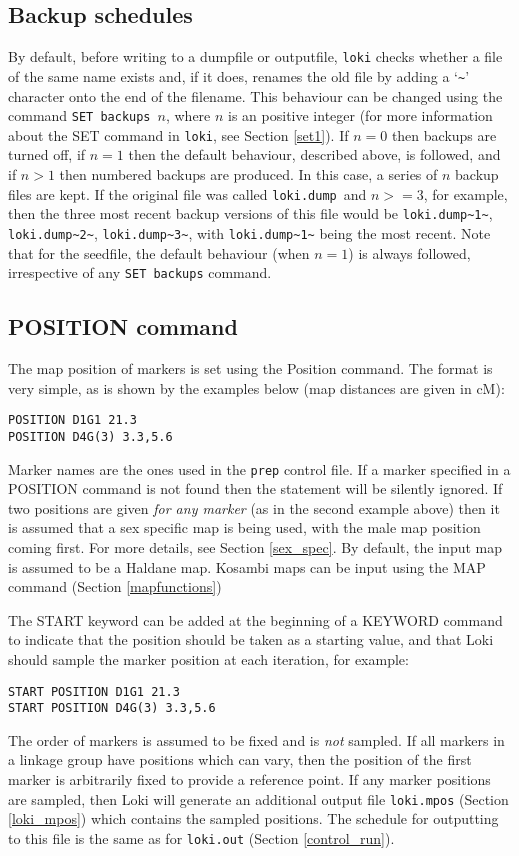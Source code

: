 \documentclass[10pt,a4paper]{article}
\newcommand{\Prep}{\texttt{prep}\xspace}
\newcommand{\Loki}{\texttt{loki}\xspace}
\begin{document}
\subsection{Backup schedules}\label{bk1}
By default, before writing to a dumpfile or outputfile, \Loki checks whether
a file of the same name exists and, if it does, renames the old file by
adding a `\verb+~+' character onto the end of the filename.  This behaviour can be
changed using the command \verb+SET backups+\ $n$, where $n$ is an positive
integer (for more information about the SET command in \Loki, see Section
\ref{set1}).  If $n=0$ then backups are turned off, if $n=1$ then the
default behaviour, described above, is followed, and if $n>1$ then numbered
backups are produced.  In this case, a series of $n$ backup files are kept.
If the original file was called \verb+loki.dump+\ and $n>=3$, for example,
then the three most recent backup versions of this file would be
\verb+loki.dump~1~+, \verb+loki.dump~2~+,
\verb+loki.dump~3~+, with \verb+loki.dump~1~+ being the most recent.  Note
that for the seedfile, the default behaviour (when $n=1$) is always
followed, irrespective of any \verb+SET backups+ command.
\subsection{POSITION command}\label{pos1}
The map position of markers is set using the Position command.  The format
is very simple, as is shown by the examples below (map distances are given
in cM):
\begin{verbatim}
POSITION D1G1 21.3
POSITION D4G(3) 3.3,5.6
\end{verbatim}
Marker names are the ones used in the \Prep control file.  If a marker
specified in a POSITION command is not found then the statement will be
silently ignored. If two positions are given \emph{for any marker} (as in
the second example above) then it is assumed that a sex specific map is
being used, with the male map position coming first.  For more details, see
Section \ref{sex_spec}.  By default, the input map is assumed to be a
Haldane map.  Kosambi maps can be input using the MAP command
(Section \ref{mapfunctions})

\label{loki_mpos1}
The START keyword can be added at the beginning of a KEYWORD command to
indicate that the position should be taken as a starting value, and that
Loki should sample the marker position at each iteration, for example:
\begin{verbatim}
START POSITION D1G1 21.3
START POSITION D4G(3) 3.3,5.6
\end{verbatim}
The order of markers is assumed to be fixed and is \emph{not} sampled.  If
all markers in a linkage group have positions which can vary, then the
position of the first marker is arbitrarily fixed to provide a reference
point.  If any marker positions are sampled, then Loki will generate an
additional output file \verb+loki.mpos+ (Section \ref{loki_mpos}) which contains the sampled
positions.  The schedule for outputting to this file is the same as for
\verb+loki.out+ (Section \ref{control_run}).
\end{document}
